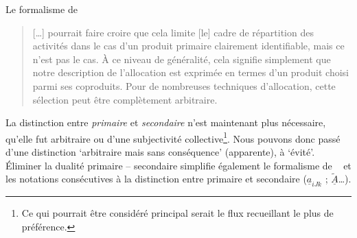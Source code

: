 Le formalisme de \citeauthor{majeau-bettez_unified_2014}
\blockcquote[traduction]{majeau-bettez_unified_2014}{
[\ldots] pourrait faire croire que cela limite [le] cadre de répartition des activités dans le cas d'un produit primaire clairement identifiable, mais ce n'est pas le cas.
À ce niveau de généralité, cela signifie simplement que notre description de l'allocation est exprimée en termes d'un produit choisi parmi ses coproduits.
Pour de nombreuses techniques d'allocation, cette sélection peut être complètement arbitraire.
}
La distinction entre \emph{primaire} et \emph{secondaire} n'est maintenant plus nécessaire, qu'elle fut arbitraire ou d'une subjectivité collective\footnote{Ce qui pourrait être considéré principal serait le flux recueillant le plus de préférence.}.
Nous pouvons donc passé d'une distinction `arbitraire mais sans conséquence' (apparente), à `évité'.
Éliminer la dualité primaire -- secondaire simplifie également le formalisme de ~\citeauthor{majeau-bettez_unified_2014} et les notations consécutives à la distinction entre primaire et secondaire ($\underline{a}_{iJk}$ ; $\tilde{\underline{A}}$\ldots).

